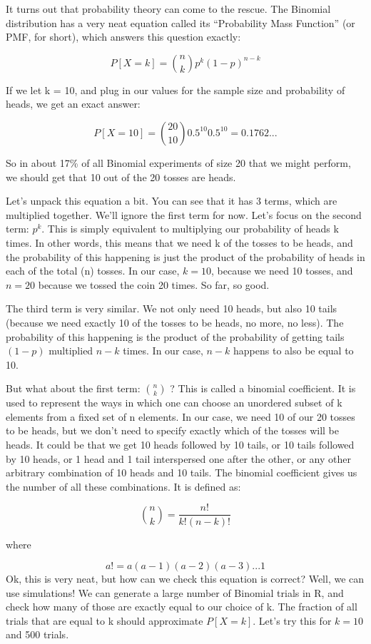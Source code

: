 \documentclass[
]{book}
\begin{document}
It turns out that probability theory can come to the rescue. The Binomial distribution has a very neat equation called its ``Probability Mass Function'' (or PMF, for short), which answers this question exactly:

\[P[ X = k ] = {n \choose k}p^{k}(1-p)^{n-k}\]

If we let k = 10, and plug in our values for the sample size and probability of heads, we get an exact answer:

\[P[ X = 10 ] = {20 \choose 10}0.5^{10}0.5^{10} = 0.1762...\]

So in about 17\% of all Binomial experiments of size 20 that we might perform, we should get that 10 out of the 20 tosses are heads.

Let's unpack this equation a bit. You can see that it has 3 terms, which are multiplied together. We'll ignore the first term for now. Let's focus on the second term: \(p^{k}\). This is simply equivalent to multiplying our probability of heads k times. In other words, this means that we need k of the tosses to be heads, and the probability of this happening is just the product of the probability of heads in each of the total (n) tosses. In our case, \(k=10\), because we need 10 tosses, and \(n=20\) because we tossed the coin 20 times. So far, so good.

The third term is very similar. We not only need 10 heads, but also 10 tails (because we need exactly 10 of the tosses to be heads, no more, no less). The probability of this happening is the product of the probability of getting tails \((1-p)\) multiplied \(n-k\) times. In our case, \(n-k\) happens to also be equal to 10.

But what about the first term: \(n \choose k\) ? This is called a binomial coefficient. It is used to represent the ways in which one can choose an unordered subset of k elements from a fixed set of n elements. In our case, we need 10 of our 20 tosses to be heads, but we don't need to specify exactly which of the tosses will be heads. It could be that we get 10 heads followed by 10 tails, or 10 tails followed by 10 heads, or 1 head and 1 tail interspersed one after the other, or any other arbitrary combination of 10 heads and 10 tails. The binomial coefficient gives us the number of all these combinations. It is defined as:

\[{n \choose k} = \frac{n!}{k!(n-k)!}\]

where

\[a! = a(a-1)(a-2)(a-3) ...1\]
Ok, this is very neat, but how can we check this equation is correct? Well, we can use simulations! We can generate a large number of Binomial trials in R, and check how many of those are exactly equal to our choice of k. The fraction of all trials that are equal to k should approximate \(P[X=k]\). Let's try this for \(k=10\) and 500 trials.
\end{document}
